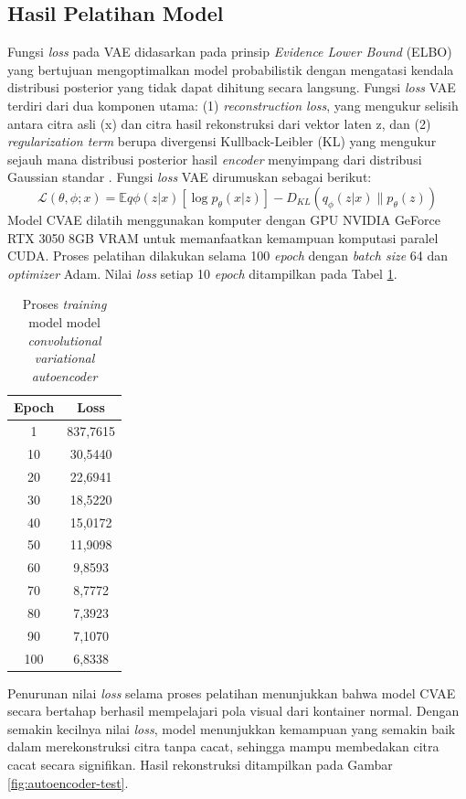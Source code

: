 \subsection{Hasil Pelatihan Model}
Fungsi \textit{loss} pada VAE didasarkan pada prinsip
\textit{Evidence Lower Bound}
(ELBO) yang bertujuan mengoptimalkan model probabilistik dengan
mengatasi kendala distribusi posterior yang tidak dapat dihitung
secara langsung. Fungsi \textit{loss} VAE terdiri dari dua komponen utama: (1)
\textit{reconstruction loss}, yang mengukur selisih antara citra asli (x) dan
citra hasil rekonstruksi dari vektor laten z, dan (2) \textit{regularization
term} berupa divergensi Kullback-Leibler (KL) yang mengukur sejauh
mana distribusi posterior hasil \textit{encoder} menyimpang dari distribusi
Gaussian standar \citep{26}. Fungsi \textit{loss} VAE dirumuskan
sebagai berikut:
\begin{equation}
  \mathcal{L}(\theta, \phi; x) = \mathbb{E}{q\phi(z|x)}[\log
  p_\theta(x|z)] - D_{KL}(q_\phi(z|x) \parallel p_\theta(z))
\end{equation}
\indent
Model CVAE dilatih
menggunakan komputer dengan GPU NVIDIA GeForce RTX 3050 8GB VRAM
untuk memanfaatkan kemampuan komputasi paralel CUDA. Proses pelatihan
dilakukan selama 100 \textit{epoch} dengan
\textit{batch size} 64
dan \textit{optimizer} Adam. Nilai \textit{loss} setiap 10
\textit{epoch} ditampilkan pada Tabel \ref{tab:training-autoencoder}.

\begin{table}[H]
  \caption{Proses \textit{training} model model \textit{convolutional
  variational autoencoder}}
  \label{tab:training-autoencoder}
  \vspace{-1em}
  \centering
  \begin{tabular}{cc}
    \toprule
    \textbf{Epoch} & \textbf{Loss} \\
    \midrule
    1 & 837,7615 \\
    10 & 30,5440 \\
    20 & 22,6941 \\
    30 & 18,5220 \\
    40 & 15,0172 \\
    50 & 11,9098 \\
    60 & 9,8593 \\
    70 & 8,7772 \\
    80 & 7,3923 \\
    90 & 7,1070 \\
    100 & 6,8338 \\
    \bottomrule
  \end{tabular}
\end{table}
Penurunan nilai \textit{loss} selama proses pelatihan menunjukkan bahwa model
CVAE secara bertahap berhasil mempelajari pola visual dari kontainer
normal. Dengan semakin kecilnya nilai \textit{loss}, model menunjukkan
kemampuan yang semakin baik dalam merekonstruksi citra tanpa cacat,
sehingga mampu membedakan citra cacat secara signifikan. Hasil
rekonstruksi ditampilkan pada Gambar \ref{fig:autoencoder-test}.

